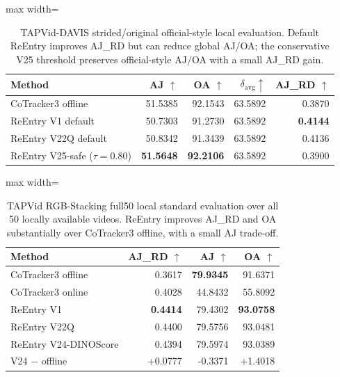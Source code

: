 \begin{table}[t]
\centering
\caption{TAPVid-DAVIS strided/original official-style local evaluation. Default ReEntry improves AJ\_RD but can reduce global AJ/OA; the conservative V25 threshold preserves official-style AJ/OA with a small AJ\_RD gain.}
\label{tab:davis_strided_original}
\small
\begin{adjustbox}{max width=\linewidth}
\begin{tabular}{lrrrr}
\toprule
Method & AJ $\uparrow$ & OA $\uparrow$ & $\delta_{\mathrm{avg}} \uparrow$ & AJ\_RD $\uparrow$ \\
\midrule
CoTracker3 offline & 51.5385 & 92.1543 & 63.5892 & 0.3870 \\
ReEntry V1 default & 50.7303 & 91.2730 & 63.5892 & \textbf{0.4144} \\
ReEntry V22Q default & 50.8342 & 91.3439 & 63.5892 & 0.4136 \\
ReEntry V25-safe ($\tau=0.80$) & \textbf{51.5648} & \textbf{92.2106} & 63.5892 & 0.3900 \\
\bottomrule
\end{tabular}
\end{adjustbox}
\end{table}

\begin{table}[t]
\centering
\caption{TAPVid RGB-Stacking full50 local standard evaluation over all 50 locally available videos. ReEntry improves AJ\_RD and OA substantially over CoTracker3 offline, with a small AJ trade-off.}
\label{tab:rgb_full50}
\small
\begin{adjustbox}{max width=\linewidth}
\begin{tabular}{lrrr}
\toprule
Method & AJ\_RD $\uparrow$ & AJ $\uparrow$ & OA $\uparrow$ \\
\midrule
CoTracker3 offline & 0.3617 & \textbf{79.9345} & 91.6371 \\
CoTracker3 online & 0.4028 & 44.8432 & 55.8092 \\
ReEntry V1 & \textbf{0.4414} & 79.4302 & \textbf{93.0758} \\
ReEntry V22Q & 0.4400 & 79.5756 & 93.0481 \\
ReEntry V24-DINOScore & 0.4394 & 79.5974 & 93.0389 \\
\midrule
V24 $-$ offline & +0.0777 & -0.3371 & +1.4018 \\
\bottomrule
\end{tabular}
\end{adjustbox}
\end{table}

